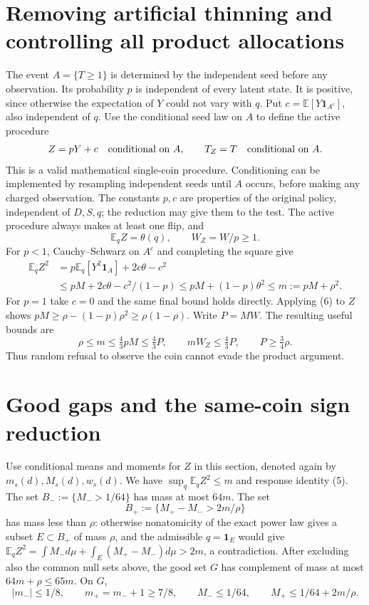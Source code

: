 \documentclass[11pt]{article}
\newcommand{\E}{\mathbb E}
\newcommand{\ind}{\mathbf1}
\begin{document}
\section{Removing artificial thinning and controlling all product allocations}
The event $A=\{T\ge1\}$ is determined by the independent seed before any
observation. Its probability $p$ is independent of every latent state. It is
positive, since otherwise the expectation of $Y$ could not vary with $q$.
Put $c=\E[Y\ind_{A^c}]$, also independent of $q$.
Use the conditional seed law on $A$ to define the active procedure
\[
 Z=pY+c\quad\hbox{conditional on }A,
 \qquad T_Z=T\quad\hbox{conditional on }A.
\]
This is a valid mathematical single-coin procedure. Conditioning can be
implemented by resampling independent seeds until $A$ occurs, before making
any charged observation. The constants $p,c$ are properties of the original
policy, independent of $D,S,q$; the reduction may give them to the test.
The active procedure always makes at least one flip, and
\[
 \E_q Z=\theta(q),\qquad W_Z=W/p\ge1.
\]
For $p<1$, Cauchy--Schwarz on $A^c$ and completing the square give
\begin{align*}
 \E_q Z^2
 &=p\E_q[Y^2\ind_A]+2c\theta-c^2\\
 &\le pM+2c\theta-c^2/(1-p)
 \le pM+(1-p)\theta^2
 \le m:=pM+\rho^2.
\end{align*}
For $p=1$ take $c=0$ and the same final bound holds directly.
Applying (6) to $Z$ shows
$pM\ge\rho-(1-p)\rho^2\ge\rho(1-\rho)$.
Write $P=MW$. The resulting useful bounds are
\[
 \rho\le m\le\tfrac43pM\le\tfrac43P,
 \qquad mW_Z\le\tfrac43P,
 \qquad P\ge\tfrac34\rho.                               \tag{7}
\]
Thus random refusal to observe the coin cannot evade the product argument.

\section{Good gaps and the same-coin sign reduction}
Use conditional means and moments for $Z$ in this section, denoted again by
$m_s(d),M_s(d),w_s(d)$. We have $\sup_q\E_qZ^2\le m$ and response identity (5).
The set $B_-:=\{M_->1/64\}$ has mass at most $64m$.
The set
\[
 B_+:=\{M_+-M_->2m/\rho\}
\]
has mass less than $\rho$: otherwise nonatomicity of the exact power law gives
a subset $E\subset B_+$ of mass $\rho$, and the admissible $q=\ind_E$ would
give $\E_q Z^2=\int M_-d\mu+\int_E(M_+-M_-)d\mu>2m$, a contradiction.
After excluding also the common null sets above, the good set $G$ has complement
of mass at most $64m+\rho\le65m$. On $G$,
\[
 |m_-|\le1/8,\qquad m_+=m_-+1\ge7/8,
 \qquad M_-\le1/64,\qquad M_+\le1/64+2m/\rho.             \tag{8}
\]
\end{document}
